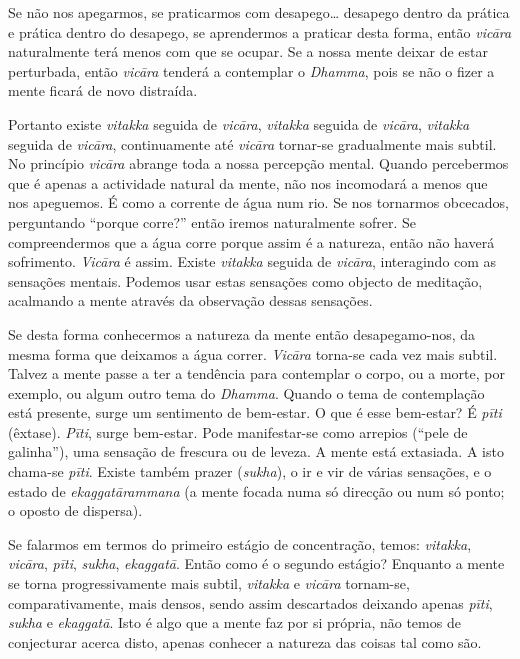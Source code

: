 Se não nos apegarmos, se praticarmos com desapego\ldots{} desapego
dentro da prática e prática dentro do desapego, se aprendermos a
praticar desta forma, então \emph{vicāra} naturalmente terá menos com
que se ocupar. Se a nossa mente deixar de estar perturbada, então
\emph{vicāra} tenderá a contemplar o \emph{Dhamma}, pois se não o fizer
a mente ficará de novo distraída.

Portanto existe \emph{vitakka} seguida de \emph{vicāra}, \emph{vitakka}
seguida de \emph{vicāra}, \emph{vitakka} seguida de \emph{vicāra},
continuamente até \emph{vicāra} tornar-se gradualmente mais subtil. No
princípio \emph{vicāra} abrange toda a nossa percepção mental. Quando
percebermos que é apenas a actividade natural da mente, não nos
incomodará a menos que nos apeguemos. É como a corrente de água num rio.
Se nos tornarmos obcecados, perguntando ``porque corre?'' então iremos
naturalmente sofrer. Se compreendermos que a água corre porque assim é a
natureza, então não haverá sofrimento. \emph{Vicāra} é assim. Existe
\emph{vitakka} seguida de \emph{vicāra}, interagindo com as sensações
mentais. Podemos usar estas sensações como objecto de meditação,
acalmando a mente através da observação dessas sensações.

Se desta forma conhecermos a natureza da mente então desapegamo-nos, da
mesma forma que deixamos a água correr. \emph{Vicāra} torna-se cada vez
mais subtil. Talvez a mente passe a ter a tendência para contemplar o
corpo, ou a morte, por exemplo, ou algum outro tema do \emph{Dhamma}.
Quando o tema de contemplação está presente, surge um sentimento de
bem-estar. O que é esse bem-estar? É \emph{pīti} (êxtase). \emph{Pīti},
surge bem-estar. Pode manifestar-se como arrepios (``pele de galinha''),
uma sensação de frescura ou de leveza. A mente está extasiada. A isto
chama-se \emph{pīti}. Existe também prazer (\emph{sukha}), o ir e vir de
várias sensações, e o estado de \emph{ekaggatārammana} (a mente focada
numa só direcção ou num só ponto; o oposto de dispersa).

Se falarmos em termos do primeiro estágio de concentração, temos:
\emph{vitakka}, \emph{vicāra}, \emph{pīti}, \emph{sukha},
\emph{ekaggatā}. Então como é o segundo estágio? Enquanto a mente se
torna progressivamente mais subtil, \emph{vitakka} e \emph{vicāra}
tornam-se, comparativamente, mais densos, sendo assim descartados
deixando apenas \emph{pīti}, \emph{sukha} e \emph{ekaggatā}. Isto é algo
que a mente faz por si própria, não temos de conjecturar acerca disto,
apenas conhecer a natureza das coisas tal como são.

